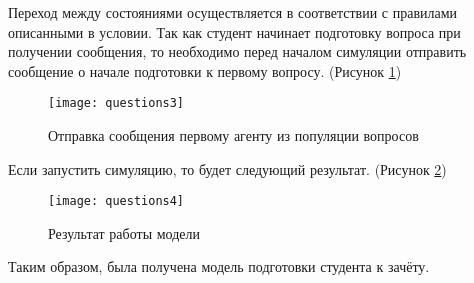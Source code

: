 Переход между состояниями осуществляется в соответствии с правилами описанными в условии. Так как студент начинает подготовку вопроса при получении сообщения, то необходимо перед началом симуляции отправить сообщение о начале подготовки к первому вопросу. (Рисунок \ref{fig:questions3})
\begin{figure}[h]
	\centering \texttt{[image: questions3]}
	\caption{Отправка сообщения первому агенту из популяции вопросов}
	\label{fig:questions3}
\end{figure}

\newpage

Если запустить симуляцию, то будет следующий результат. (Рисунок \ref{fig:questions4})
\begin{figure}[h]
	\centering \texttt{[image: questions4]}
	\caption{Результат работы модели}
	\label{fig:questions4}
\end{figure}

Таким образом, была получена модель подготовки студента к зачёту.